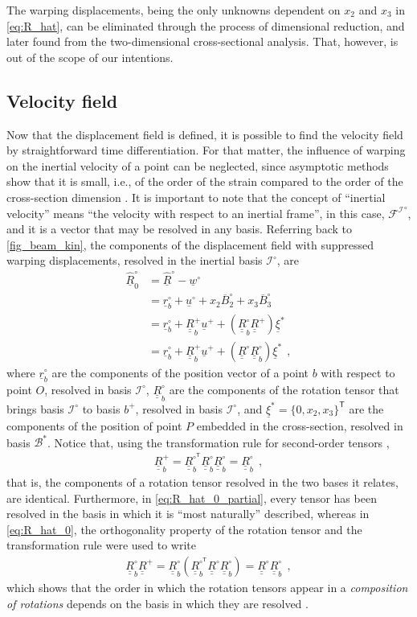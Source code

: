 \documentclass[12pt,a4paper,oneside,english]{abntex2} %
\newcommand{\vect}[1]{\underline{#1}}
\newcommand{\uvec}[1]{\overline{#1}}
\def\tens#1{\underline{\underline{#1}}}
\def\lp{\left(}
\def\rp{\right)}
\def\T{\mathsf{T}}
\def\bp{b^+}
\def\Io{\mathcal{I}^{\circ}}
\def\R{\tens{R}}
\def\Rp{\R^+}
\def\Ro{\R^{\circ}}
\def\Rbp{\R^{+}_b}
\def\Rbo{\R^{\circ}_b}
\def\RboT{\R^{\circ^\T}_b}
\def\rbo{\vect{r}^{\circ}_b}
\def\u{\vect{u}}
\def\uplus{\u^{+}}
\def\uo{\u^{\circ}}
\def\xis{\vect{\xi}^{*}}
\begin{document}
The warping displacements, being the only unknowns dependent on $x_2$ and $x_3$ in \cref{eq:R_hat}, can be eliminated through the process of dimensional reduction, and later found from the two-dimensional cross-sectional analysis. That, however, is out of the scope of our intentions. 

\subsection{Velocity field}

Now that the displacement field is defined, it is possible to find the velocity field by straightforward time differentiation. For that matter, the influence of warping on the inertial velocity of a point can be neglected, since asymptotic methods show that it is small, i.e., of the order of the strain compared to the order of the cross-section dimension \cite{hodges2006nonlinear}. It is important to note that the concept of  ``inertial velocity'' means ``the velocity with respect to an inertial frame'', in this case, $\mathcal{F^I}^{\circ}$, and it is a vector that may be resolved in any basis. Referring back to \cref{fig_beam_kin}, the components of the displacement field with suppressed warping displacements, resolved in the inertial basis $\Io$, are
\begin{align}
    \hat{\vect{R}}^{\circ}_0 
    &= \hat{\vect{R}}^{\circ} - \vect{w}^{\circ} \nonumber 
    \\
    &= \rbo + \uo + x_2\uvec{B}_2^\circ + x_3\uvec{B}_3^\circ \nonumber 
    \\
    &= \rbo + \Rbp\uplus + \lp\Rbo\Rp\rp\xis 
    \label{eq:R_hat_0_partial} 
    \\
    &= \rbo + \Rbp\uplus + \lp\Ro\Rbo\rp\xis \ \ ,
    \label{eq:R_hat_0}    
\end{align}
where $\rbo$ are the components of the position vector of a point $b$ with respect to point $O$, resolved in basis $\Io$, $\Rbo$ are the components of the rotation tensor that brings basis $\Io$ to basis $\bp$, resolved in basis $\Io$, and $\xis = \{0, x_2, x_3\}^\T$ are the components of the position of point $P$ embedded in the cross-section, resolved in basis $\mathcal{B}^{*}$. Notice that, using the transformation rule for second-order tensors \cite{bauchau2011flexible},
\begin{align}
    \Rbp = \RboT\Rbo\Rbo = \Rbo \ \ ,
    \label{eq:Rbp}    
\end{align}
that is, the components of a rotation tensor resolved in the two bases it relates, are identical. Furthermore, in \cref{eq:R_hat_0_partial}, every tensor has been resolved in the basis in which it is ``most naturally'' described, whereas in \cref{eq:R_hat_0}, the orthogonality property of the rotation tensor and the transformation rule were used to write 
\begin{align}
    \Rbo\Rp = \Rbo\lp\RboT\Ro\Rbo\rp = \Ro\Rbo \ \ ,
\label{eq:RboRp}    
\end{align}
which shows that the order in which the rotation tensors appear in a \textit{composition of rotations} depends on the basis in which they are resolved \cite{bauchau2011flexible}.
\end{document}
